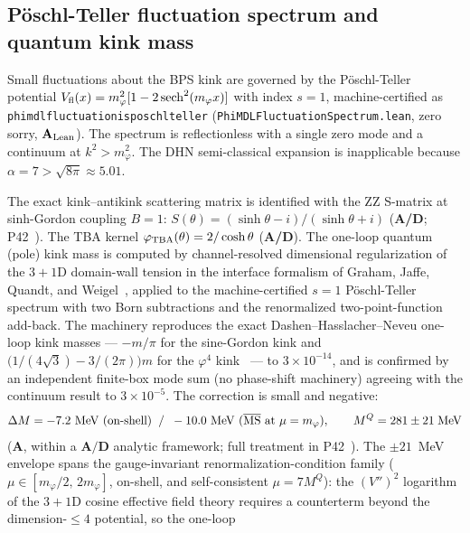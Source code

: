 \documentclass[11pt]{article}
\theoremstyle{remark}
\newcommand{\lean}[1]{%
  \penalty-100
  \begingroup\def\_{\textunderscore\allowbreak}\texttt{#1}\endgroup}
\newcommand{\CatA}{\textbf{A}}
\newcommand{\CatAL}{\ensuremath{\textbf{A}_{\rm Lean}}}
\newcommand{\CatAD}{\textbf{A/D}}
\begin{document}
\subsection{Pöschl-Teller fluctuation spectrum and quantum kink mass}
\label{ssec:pt_spectrum}

Small fluctuations about the BPS kink are governed by the Pöschl-Teller potential
$V_{\rm fl}(x) = m_\varphi^2[1 - 2\,\mathrm{sech}^2(m_\varphi x)]$ with index $s=1$,
machine-certified as \lean{phimdl\_fluctuation\_is\_poschl\_teller}
(\texttt{PhiMDLFluctuationSpectrum.lean}, zero sorry, $\CatAL$).
The spectrum is reflectionless with a single zero mode and a continuum at $k^2 > m_\varphi^2$.
The DHN semi-classical expansion is inapplicable because $\alpha = 7 > \sqrt{8\pi} \approx 5.01$.

The exact kink--antikink scattering matrix is identified with the ZZ S-matrix
at sinh-Gordon coupling $B=1$:
$S(\theta) = (\sinh\theta - i)/(\sinh\theta + i)$
(\CatAD; P42~\cite{SpivackPhiMDLField}).
The TBA kernel $\varphi_{\rm TBA}(\theta) = 2/\cosh\theta$ (\CatAD).
The one-loop quantum (pole) kink mass is computed by channel-resolved dimensional
regularization of the $3{+}1$D domain-wall tension in the interface formalism of
Graham, Jaffe, Quandt, and Weigel~\cite{GrahamJaffeQuandtWeigel2001}, applied to the
machine-certified $s{=}1$ Pöschl-Teller spectrum with two Born subtractions and the
renormalized two-point-function add-back.
The machinery reproduces the exact Dashen--Hasslacher--Neveu one-loop kink
masses --- $-m/\pi$ for the sine-Gordon kink and
$\bigl(1/(4\sqrt{3}) - 3/(2\pi)\bigr)m$ for the $\varphi^4$
kink~\cite{DashenHasslacherNeveu1974,Rajaraman1982} --- to $3\times10^{-14}$,
and is confirmed by an independent finite-box mode sum (no phase-shift machinery)
agreeing with the continuum result to $3\times10^{-5}$.
The correction is small and negative:
\begin{equation}
  \Delta M = -7.2~\text{MeV (on-shell)}
  \;\;/\;\; -10.0~\text{MeV } (\overline{\rm MS}\text{ at }\mu = m_\varphi),
  \qquad
  M^Q = 281 \pm 21\;\text{MeV}
  \label{eq:MQ}
\end{equation}
($\CatA$, within a $\CatAD$ analytic framework; full treatment in
P42~\cite{SpivackPhiMDLField}).
The $\pm21$~MeV envelope spans the gauge-invariant renormalization-condition family
($\mu \in [m_\varphi/2,\,2m_\varphi]$, on-shell, and self-consistent $\mu = 7M^Q$):
the $(V'')^2$ logarithm of the $3{+}1$D cosine effective field theory requires a
counterterm beyond the dimension-$\leq4$ potential, so the one-loop
\end{document}
